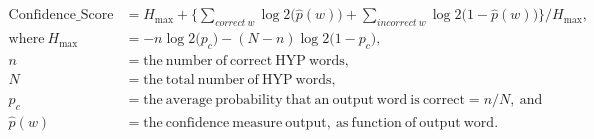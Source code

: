 \documentclass[preview]{standalone}
\begin{document}
\begin{align*}
{\mathrm{Confidence\_Score}} &= H_{\mathrm{max}} + \Bigg\{ \sum_{correct\ w} \log2 \Big( \hat{p}(w) \Big) + \sum_{incorrect\ w} \log2 \Big( 1 - \hat{p}(w) \Big) \Bigg\} /  H_{\mathrm{max}}, \\
\mathrm{where\ } H_{\mathrm{max}} &= -n \log2 \Big( p_c \Big) - ( N - n ) \log2 \Big( 1 - p_c \Big), \\
n &= \mathrm{the\ number\ of\ correct\ HYP\ words}, \\
N &= \mathrm{the\ total\ number\ of\ HYP\ words}, \\
p_c &= \mathrm{the\ average\ probability\ that\ an\ output\ word\ is\ correct} = n/N, \mathrm{\ and} \\
\hat{p}(w) &= \mathrm{the\ confidence\ measure\ output,\ as\ function\ of\ output\ word}.
\end{align*}
\end{document}
